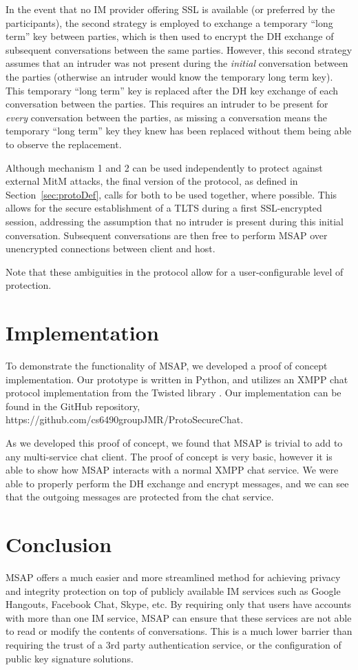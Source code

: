 \documentclass[twoside,10pt]{article}
\begin{document}
\begin{multicols}{2}
In the event that no IM provider offering SSL is available (or preferred by the participants), the second strategy is employed to exchange a temporary ``long term'' key between parties, which is then used to encrypt the DH exchange of subsequent conversations between the same parties.  However, this second strategy assumes that an intruder was not present during the \emph{initial} conversation between the parties (otherwise an intruder would know the temporary long term key).  This temporary ``long term'' key is replaced after the DH key exchange of each conversation between the parties.  This requires an intruder to be  present for \emph{every} conversation between the parties, as missing a conversation means the temporary ``long term'' key they knew has been replaced without them being able to observe the replacement.

Although mechanism 1 and 2 can be used independently to protect against external MitM attacks, the final version of the protocol, as defined in Section~\ref{sec:protoDef}, calls for both to be used together, where possible.  This allows for the secure establishment of a TLTS during a first SSL-encrypted session, addressing the assumption that no intruder is present during this initial conversation.  Subsequent conversations are then free to perform MSAP over unencrypted connections between client and host.

Note that these ambiguities in the protocol allow for a user-configurable level of protection.

\section{Implementation}
To demonstrate the functionality of MSAP, we developed a proof of concept implementation.  Our prototype is written in Python, and utilizes an XMPP chat protocol implementation from the Twisted library \cite{TwistedHomepage}.  Our implementation can be found in the GitHub repository, https://github.com/cs6490groupJMR/ProtoSecureChat.

As we developed this proof of concept, we found that MSAP is trivial to add to any multi-service chat client.  The proof of concept is very basic, however it is able to show how MSAP interacts with a normal XMPP chat service.  We were able to properly perform the DH exchange and encrypt messages, and we can see that the outgoing messages are protected from the chat service.

\section{Conclusion}
MSAP offers a much easier and more streamlined method for achieving privacy and integrity protection on top of publicly available IM services such as Google Hangouts, Facebook Chat, Skype, etc.  By requiring only that users have accounts with more than one IM service, MSAP can ensure that these services are not able to read or modify the contents of conversations.  This is a much lower barrier than requiring the trust of a 3rd party authentication service, or the configuration of public key signature solutions.


\end{multicols}
\end{document}
